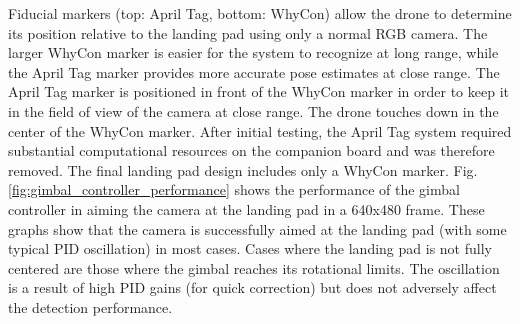 \documentclass[a1paper, landscape, blockverticalspace=1cm, 14pt]{tikzposter}
\begin{document}
\begin{columns}
    {
        \normalsize
        \begin{minipage}[t]{0.75\linewidth}

            Fiducial markers (top: April Tag\cite{apriltag_paper}, bottom: WhyCon\cite{whycon_paper}) allow the drone to determine its position relative to the landing pad using only a normal RGB camera.
            The larger WhyCon marker is easier for the system to recognize at long range, while the April Tag marker provides more accurate pose estimates at close range.
            The April Tag marker is positioned in front of the WhyCon marker in order to keep it in the field of view of the camera at close range.
            The drone touches down in the center of the WhyCon marker.
            After initial testing, the April Tag system required substantial computational resources on the companion board and was therefore removed.
            The final landing pad design includes only a WhyCon marker.
            Fig. \ref{fig:gimbal_controller_performance} shows the performance of the gimbal controller in aiming the camera at the landing pad in a 640x480 frame.
            These graphs show that the camera is successfully aimed at the landing pad (with some typical PID oscillation) in most cases.
            Cases where the landing pad is not fully centered are those where the gimbal reaches its rotational limits.
            The oscillation is a result of high PID gains (for quick correction) but does not adversely affect the detection performance.


\end{minipage}}
\end{columns}
\end{document}
